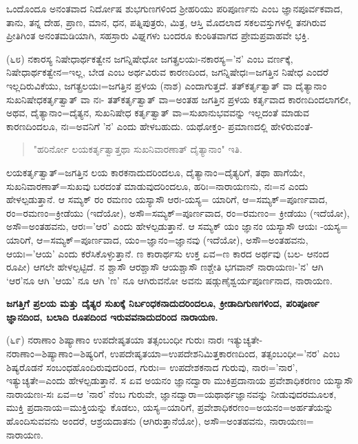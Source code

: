 ಒಂದೊಂದೂ ಅನಂತವಾದ ನಿರ್ದೋಷ ಶುಭಗುಣಗಳಿಂದ ಶ‍್ರೀಹರಿಯು ಪರಿಪೂರ್ಣನು ಎಂಬ ಜ್ಞಾನಪೂರ್ವಕವಾದ, ತಾನು, ತನ್ನ ದೇಹ, ಪ್ರಾಣ, ಮಾನ, ಧನ, ಪತ್ನಿಪುತ್ರರು, ಮಿತ್ರ, ಆಸ್ತಿ ಮೊದಲಾದ ಸಕಲವಸ್ತುಗಳಲ್ಲಿ ತನಗಿರುವ ಪ್ರೀತಿಗಿಂತ ಅನಂತಮಡಿಯಾಗಿ, ಸಹಸ್ರಾರು ವಿಘ್ನಗಳು ಬಂದರೂ ಕುಂಠಿತವಾಗದ ಪ್ರೇಮಪ್ರವಾಹವೇ ಭಕ್ತಿ.

(೬೮) ನಕಾರಸ್ಯ ನಿಷೇಧಾರ್ಥಕತ್ವೇನ ಜಗನ್ನಿಷೇಧೋ ಜಗತ್ಪ್ರಲಯಃ-ನಕಾರಸ್ಯ='ನ' ಎಂಬ ವರ್ಣಕ್ಕೆ, ನಿಷೇಧಾರ್ಥಕತ್ವೇನ=ಇಲ್ಲ, ಬೇಡ ಎಂಬ ಅರ್ಥವಿರುವ ಕಾರಣದಿಂದ, ಜಗನ್ನಿಷೇಧಃ=ಜಗತ್ತಿನ ನಿಷೇಧ ಎಂದರೆ ಇಲ್ಲದಿರುವಿಕೆಯು, ಜಗತ್ಪ್ರಲಯಃ=ಜಗತ್ತಿನ ಪ್ರಳಯ (ನಾಶ) ಎಂದಾಗುತ್ತದೆ. ತತ್‌ಕರ್ತೃತ್ವಾತ್ ವಾ ದೈತ್ಯಾನಾಂ ಸುಖನಿಷೇಧಕರ್ತೃತ್ವಾತ್ ವಾ ನಃ- ತತ್‌ಕರ್ತೃತ್ವಾತ್ ವಾ=ಅಂತಹ ಜಗತ್ತಿನ ಪ್ರಳಯ ಕರ್ತೃವಾದ ಕಾರಣದಿಂದಲಾಗಲೀ, ಅಥವ, ದೈತ್ಯಾನಾಂ=ದೈತ್ಯನ, ಸುಖನಿಷೇಧ ಕರ್ತೃತ್ವಾತ್ ವಾ=ಸುಖಾನುಭವವನ್ನು ಇಲ್ಲದಂತೆ ಮಾಡುವ ಕಾರಣದಿಂದಲೂ, ನಃ=ಅವನಿಗೆ 'ನ' ಎಂದು ಹೇಳಬಹುದು. ಯಥೋಕ್ತಂ- ಪ್ರಮಾಣದಲ್ಲಿ ಹೇಳಿರುವಂತೆ-

\begin{verse}
"ಹರಿರ್ನೋ ಲಯಕರ್ತೃತ್ವಾತ್ತಥಾ ಸುಖನಿವಾರಣಾತ್ ದೈತ್ಯಾನಾಂ" ಇತಿ.
\end{verse}

ಲಯಕರ್ತೃತ್ವಾತ್=ಜಗತ್ತಿನ ಲಯ ಕಾರಕನಾದುದರಿಂದಲೂ, ದೈತ್ಯಾನಾಂ=ದೈತ್ಯರಿಗೆ, ತಥಾ ಹಾಗೆಯೇ, ಸುಖನಿವಾರಣಾತ್=ಸುಖವು ಬರದಂತೆ ಮಾಡುವುದರಿಂದಲೂ, ಹರಿಃ=ನಾರಾಯಣನು, ನಃ=ನ ಎಂದು ಹೇಳಲ್ಪಡುತ್ತಾನೆ. ಆ ಸಮ್ಯಕ್ ರಂ ರಮಣಂ ಯಸ್ಯಾಸೌ ಆರಃ-ಯಸ್ಯ= ಯಾರಿಗೆ, ಆ=ಸಮ್ಯಕ್=ಪೂರ್ಣವಾದ, ರಂ=ರಮಣಂ=ಕ್ರೀಡೆಯು (ಇದೆಯೋ), ಅಸೌ=ಸಮ್ಯಕ್=ಪೂರ್ಣವಾದ, ರಂ=ರಮಣಂ= ಕ್ರೀಡೆಯು (ಇದೆಯೋ), ಅಸೌ=ಅಂತಹವನು, ಆರಃ='ಆರ' ಎಂದು ಹೇಳಲ್ಪಡುತ್ತಾನೆ. ಆ ಸಮ್ಯಕ್ ಯಂ ಜ್ಞಾನಂ ಯಸ್ಯಾಸೌ ಆಯಃ -ಯಸ್ಯ= ಯಾರಿಗೆ, ಆ=ಸಮ್ಯಕ್=ಪೂರ್ಣವಾದ, ಯಂ=ಜ್ಞಾನಂ=ಜ್ಞಾನವು (ಇದೆಯೋ), ಅಸೌ=ಅಂತಹವನು, ಆಯಃ='ಆಯ' ಎಂದು ಕರೆಸಿಕೊಳ್ಳುತ್ತಾನೆ. ಣ ಕಾರಾರ್ಥಸು ಉಕ್ತ ಏವ=ಣ ಕಾರದ ಅರ್ಥವು (ಬಲ- ಆನಂದ ರೂಪೀ) ಆಗಲೇ ಹೇಳಲ್ಪಟ್ಟಿದೆ. ನ ಶ್ಚಾಸೌ ಆರಶ್ಚಾಸೌ‌ ಆಯಶ್ಚಾಸೌ ಣಶ್ಚೇತಿ ಭಗವಾನ್ ನಾರಾಯಣಃ-'ನ' ಆಗಿ `ಆರ'ನೂ ಆಗಿ 'ಆಯ' ನೂ ಆಗಿ 'ಣ' ನೂ ಆಗಿರುವನೋ ಅವನು ಷಡ್ಗುಣೈಶ್ವರ್ಯಪೂರ್ಣನಾದ, ನಾರಾಯಣ.

\begin{center}
\textbf{ಜಗತ್ತಿಗೆ ಪ್ರಲಯ ಮತ್ತು ದೈತ್ಯರ ಸುಖಕ್ಕೆ ನಿರ್ಬಂಧಕನಾದುದರಿಂದಲೂ, ಕ್ರೀಡಾದಿಗುಣಗಳಿಂದ, ಪರಿಪೂರ್ಣ ಜ್ಞಾನದಿಂದ, ಬಲಾದಿ ರೂಪದಿಂದ ಇರುವವನಾದುದರಿಂದ ನಾರಾಯಣ.}
\end{center}

(೬೯) ನರಾಣಾಂ ಶಿಷ್ಯಾಣಾಂ ಉಪದೇಷೃತಯಾ ತತ್ಸಂಬಂಧೀ ಗುರುಃ ನಾರಃ ಇತ್ಯುಚ್ಯತೇ-ನರಾಣಾಂ=ಶಿಷ್ಯಾಣಾಂ=ಶಿಷ್ಯರಿಗೆ, ಉಪದೇಷೃತಯಾ=ಉಪದೇಶನಿಮಿತ್ತಕಾರಣದಿಂದ, ತತ್ಸಂಬಂಧೀ='ನರ' ಎಂಬ ಶಿಷ್ಯರೊಡನೆ ಸಂಬಂಧಹೊಂದಿರುವುದರಿಂದ, ಗುರುಃ= ಉಪದೇಶಕನಾದ ಗುರುವು, ನಾರಃ='ನಾರ', ಇತ್ಯುಚ್ಯತೇ=ಎಂದು ಹೇಳಲ್ಪಡುತ್ತಾನೆ. ಸ ಏವ ಅಯನಂ ಜ್ಞಾನದ್ವಾರಾ ಮುಕಿಪ್ರದಾನಾಯ ಪ್ರವೇಶಾಧಿಕರಣಂ ಯಸ್ಯಾಸೌ ನಾರಾಯಣಃ-ಸಃ ಏವ=ಆ 'ನಾರ' ನೆಂಬ ಗುರುವೇ, ಜ್ಞಾನದ್ವಾರಾ=ಯಥಾರ್ಥಜ್ಞಾನವನ್ನು ನೀಡುವುದರಮೂಲಕ, ಮುಕ್ತಿ ಪ್ರದಾನಾಯ=ಮುಕ್ತಿಯನ್ನು ಕೊಡಲು, ಯಸ್ಯ=ಯಾರಿಗೆ, ಪ್ರವೇಶಾಧಿಕರಣಂ=ಅಯನಂ=ಅರ್ಹತೆಯನ್ನು ಹೊಂದಿಸುವವನು ಅಂದರೆ, ಆಶ್ರಯದಾತನು (ಆಗಿರುತ್ತಾನೆಯೋ), ಅಸೌ=ಅಂತಹವನು, ನಾರಾಯಣಃ= ನಾರಾಯಣ.

